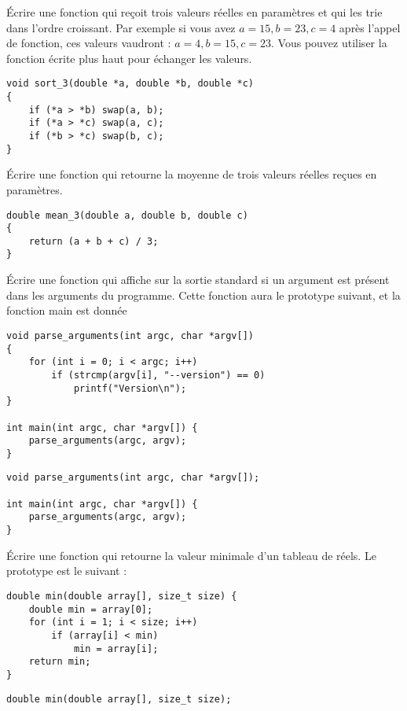 \documentclass[french,a4paper,addpoints,11pt]{exam}
\begin{document}
\begin{questions}
\question Écrire une fonction qui reçoit trois valeurs réelles en paramètres et qui les trie dans l'ordre croissant. Par exemple si vous avez $a=15, b=23, c=4$ après l'appel de fonction, ces valeurs vaudront : $a=4, b=15, c=23$. Vous pouvez utiliser la fonction  écrite plus haut pour échanger les valeurs.

\begin{solutionordottedlines}[7cm]
\begin{lstlisting}
void sort_3(double *a, double *b, double *c)
{
    if (*a > *b) swap(a, b);
    if (*a > *c) swap(a, c);
    if (*b > *c) swap(b, c);
}
\end{lstlisting}
\end{solutionordottedlines}

\question Écrire une fonction qui retourne la moyenne de trois valeurs réelles reçues en paramètres.

\begin{solutionordottedlines}[6cm]
\begin{lstlisting}
double mean_3(double a, double b, double c)
{
    return (a + b + c) / 3;
}
\end{lstlisting}
\end{solutionordottedlines}

\question Écrire une fonction qui affiche  sur la sortie standard si un argument  est présent dans les arguments du programme. Cette fonction aura le prototype suivant, et la fonction main est donnée

\ifprintanswers
\begin{solution}
\begin{lstlisting}
void parse_arguments(int argc, char *argv[])
{
    for (int i = 0; i < argc; i++)
        if (strcmp(argv[i], "--version") == 0)
            printf("Version\n");
}

int main(int argc, char *argv[]) {
    parse_arguments(argc, argv);
}
\end{lstlisting}
\end{solution}
\else
\begin{lstlisting}
void parse_arguments(int argc, char *argv[]);

int main(int argc, char *argv[]) {
    parse_arguments(argc, argv);
}
\end{lstlisting}
\fillwithdottedlines{8cm}
\fi

\question Écrire une fonction qui retourne la valeur minimale d'un tableau de réels. Le prototype est le suivant :

\ifprintanswers
\begin{solution}
\begin{lstlisting}
double min(double array[], size_t size) {
    double min = array[0];
    for (int i = 1; i < size; i++)
        if (array[i] < min)
            min = array[i];
    return min;
}
\end{lstlisting}
\end{solution}
\else
\begin{lstlisting}
double min(double array[], size_t size);
\end{lstlisting}
\fillwithdottedlines{8cm}
\fi


\end{questions}
\end{document}
